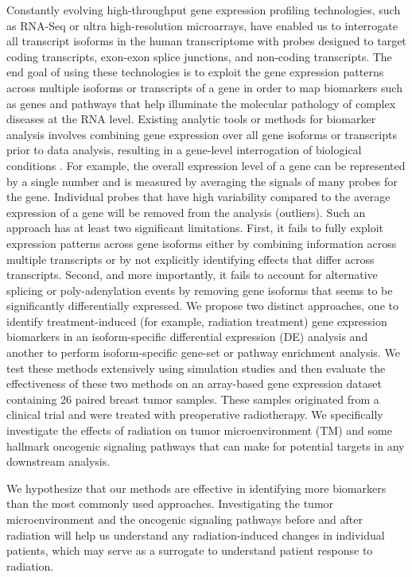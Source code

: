 \documentclass[hidelinks,11pt]{article}
\begin{document}
Constantly evolving high-throughput gene expression profiling technologies, such as RNA-Seq or ultra high-resolution microarrays, have enabled us to interrogate all transcript isoforms in the human transcriptome with probes designed to target coding transcripts, exon-exon splice junctions, and non-coding transcripts. The end goal of using these technologies is to exploit the gene expression patterns across multiple isoforms or transcripts of a gene in order to map biomarkers such as genes and pathways that help illuminate the molecular pathology of complex diseases at the RNA level. Existing analytic tools or methods for biomarker analysis involves combining gene expression over all gene isoforms or transcripts prior to data analysis, resulting in a gene-level interrogation of biological conditions \cite{collapserows,iri,gsa,gsea,gsva,seqgsea}. For example, the overall expression level of a gene can be represented by a single number and is measured by averaging the signals of many probes for the gene. Individual probes that have high variability compared to the average expression of a gene will be removed from the analysis (outliers). Such an approach has at least two significant limitations. First, it fails to fully exploit expression patterns across gene isoforms either by combining information across multiple transcripts or by not explicitly identifying effects that differ across transcripts. Second, and more importantly, it fails to account for alternative splicing or poly-adenylation events by removing gene isoforms that seems to be significantly differentially expressed. We propose two distinct approaches, one to identify treatment-induced (for example, radiation treatment) gene expression biomarkers in an isoform-specific differential expression (DE) analysis and another to perform isoform-specific gene-set or pathway enrichment analysis. We test these methods extensively using simulation studies and then evaluate the effectiveness of these two methods on an array-based gene expression dataset containing 26 paired breast tumor samples. These samples originated from a clinical trial and were treated with preoperative radiotherapy. We specifically investigate the effects of radiation on tumor microenvironment (TM) and some hallmark oncogenic signaling pathways that can make for potential targets in any downstream analysis. 

We hypothesize that our methods are effective in identifying more biomarkers than the most commonly used approaches. Investigating the tumor microenvironment and the oncogenic signaling pathways before and after radiation will help us understand any radiation-induced changes in individual patients, which may serve as a surrogate to understand patient response to radiation. 
\end{document}

